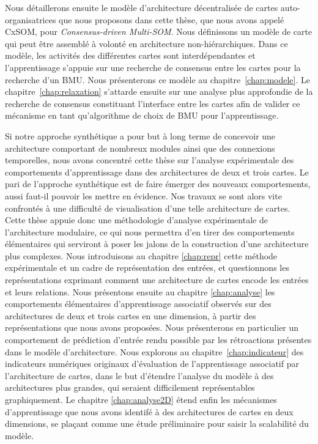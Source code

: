 Nous détaillerons ensuite le modèle d'architecture décentralisée de cartes auto-organisatrices que nous proposons dans cette thèse, que nous avons appelé CxSOM, pour \emph{Consensus-driven Multi-SOM}. 
Nous définissons un modèle de carte qui peut être assemblé à volonté en architecture non-hiérarchiques.
Dans ce modèle, les activités des différentes cartes sont interdépendantes et l'apprentissage s'appuie sur une recherche de consensus entre les cartes pour la recherche d'un BMU.
Nous présenterons ce modèle au chapitre~\ref{chap:modele}. Le chapitre~\ref{chap:relaxation} s'attarde ensuite sur une analyse plus approfondie de la recherche de consensus constituant l'interface entre les cartes afin de valider ce mécanisme en tant qu'algorithme de choix de BMU pour l'apprentissage.

Si notre approche synthétique a pour but à long terme de concevoir une architecture comportant de nombreux modules ainsi que des connexions temporelles, nous avons concentré cette thèse sur l'analyse expérimentale des comportements d'apprentissage dans des architectures de deux et trois cartes.
Le pari de l'approche synthétique est de faire émerger des nouveaux comportements, aussi faut-il pouvoir les mettre en évidence. Nos travaux se sont alors vite confrontés à une difficulté de visualisation d'une telle architecture de cartes. 
Cette thèse appuie donc une méthodologie d'analyse expérimentale de l'architecture modulaire, ce qui nous permettra d'en tirer des comportements élémentaires qui serviront à poser les jalons de la construction d'une architecture plus complexes.
Nous introduisons au chapitre \ref{chap:repr} cette méthode expérimentale et un cadre de représentation des entrées, et questionnons les représentations exprimant comment une architecture de cartes encode les entrées et leurs relations.
Nous présentons ensuite au chapitre \ref{chap:analyse} les comportements élémentaires d'apprentissage associatif observés sur des architectures de deux et trois cartes en une dimension, à partir des représentations que nous avons proposées. Nous présenterons en particulier un comportement de prédiction d'entrée rendu possible par les rétroactions présentes dans le modèle d'architecture.
Nous explorons au chapitre~\ref{chap:indicateur} des indicateurs numériques originaux d'évaluation de l'apprentissage associatif par l'architecture de cartes, dans le but d'étendre l'analyse du modèle à des architectures plus grandes, qui seraient difficilement représentables graphiquement.
Le chapitre \ref{chap:analyse2D} étend enfin les mécanismes d'apprentissage que nous avons identifé à des architectures de cartes en deux dimensions, se plaçant comme une étude préliminaire pour saisir la scalabilité du modèle.




